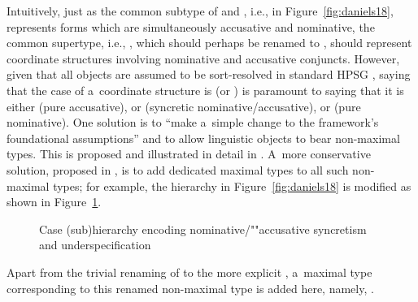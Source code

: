 \documentclass[output=paper
 	        ,biblatex
                ,babelshorthands
                ,newtxmath
                ,draftmode
                ,colorlinks, citecolor=brown
]{langscibook}
\begin{document}
\begin{exe}
\begin{xlist}
\begin{exe}
\begin{xlist}
Intuitively, just as the common subtype of  and , i.e., 
in Figure~\ref{fig:daniels18}, represents forms which are simultaneously accusative and nominative, the common
supertype, i.e., , which should perhaps be renamed to , should represent
coordinate structures involving nominative and accusative conjuncts.  However, given that all
objects are assumed to be sort-resolved in standard HPSG \added{\crossrefchapterp[\page \pageref{page-wellformedness-linguistic-objects}]{formal-background}}, saying that the case of a~coordinate
structure is  (or ) is paramount to saying that it is either
 (pure accusative), or  (syncretic nominative/accusative), or
 (pure nominative).  One solution is to “make a~simple change to the framework's
foundational assumptions” \citep[268]{sag:02} and to allow linguistic objects to bear non-maximal
types.  This is proposed and illustrated in detail in \citet{sag:02}.  A~more conservative
solution, proposed in \citet{dani:01}, is to add dedicated maximal types to all such non-maximal
types; for example, the hierarchy in Figure~\ref{fig:daniels18} is modified as shown in Figure~\ref{fig:daniels20}.
\begin{figure}
\caption{Case (sub)hierarchy encoding nominative/""accusative syncretism and underspecification}
\label{fig:daniels20} 
\end{figure}
Apart from the trivial renaming of  to the more explicit , a~maximal type corresponding to this renamed non-maximal type is added here, namely, .


\end{xlist}
\end{exe}
\end{xlist}
\end{exe}
\end{document}
